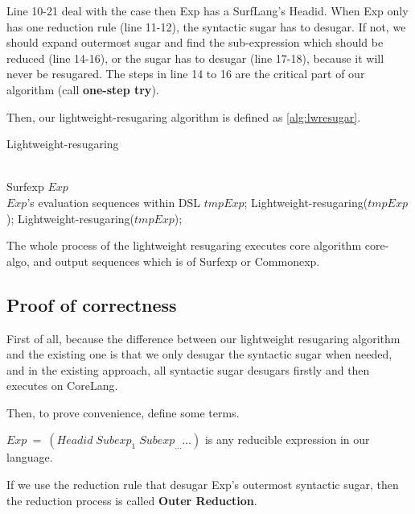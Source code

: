 Line 10-21 deal with the case then Exp has a SurfLang's Headid. When Exp only has one reduction rule (line 11-12), the syntactic sugar has to desugar. If not, we should expand outermost sugar and find the sub-expression which should be reduced (line 14-16), or the sugar has to desugar (line 17-18), because it will never be resugared. The steps in line 14 to 16 are the critical part of our algorithm (call {\bfseries one-step try}\label{mark:onesteptry}).


Then, our lightweight-resugaring algorithm is defined as \ref{alg:lwresugar}.

\begin{algorithm}
	\caption{Lightweight-resugaring}
	\label{alg:lwresugar}     %
	\begin{algorithmic}[1]       %
		\REQUIRE ~~\\      %
		Surfexp $Exp$
		\ENSURE ~~\\     %
		$Exp$'s evaluation sequences within DSL
		\RETURN
		\PRINT $tmpExp$;
		\STATE Lightweight-resugaring($tmpExp$);
		\ELSE 
		\STATE Lightweight-resugaring($tmpExp$);
		\ENDIF
		\ENDWHILE
		
	\end{algorithmic}
\end{algorithm}

The whole process of the lightweight resugaring executes core algorithm core-algo, and output sequences which is of Surfexp or Commonexp.

\subsection{Proof of correctness}

First of all, because the difference between our lightweight resugaring algorithm and the existing one is that we only desugar the syntactic sugar when needed, and in the existing approach, all syntactic sugar desugars firstly and then executes on CoreLang.

Then, to prove convenience, define some terms.

$Exp~=~(Headid\;Subexp_{1}\;Subexp_{\ldots} \ldots)$ is any reducible expression in our language.

If we use the reduction rule that desugar Exp's outermost syntactic sugar, then the reduction process is called {\bfseries Outer Reduction}.

